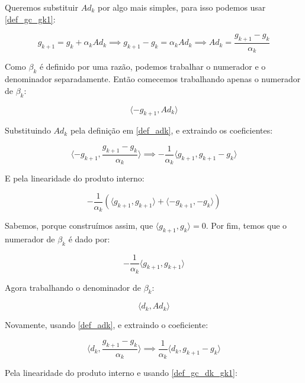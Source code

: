 Queremos substituir \(Ad_k\) por algo mais simples, para isso podemos usar \ref{def_gc_gk1}:

\begin{equation}
\label{def_adk}
g_{k+1} = g_k + \alpha_k A d_k \implies g_{k+1} - g_k = \alpha_k A d_k \implies A d_k = \frac{g_{k+1} - g_k}{\alpha_k}
\end{equation}

Como \(\beta_k\) é definido por uma razão, podemos trabalhar o numerador e o denominador
separadamente. Então comecemos trabalhando apenas o numerador de \(\beta_k\):

\begin{equation}
\langle -g_{k+1}, Ad_k \rangle
\end{equation}

Substituindo \(Ad_k\) pela definição em \ref{def_adk}, e extraindo os coeficientes:

\begin{equation}
\langle -g_{k+1}, \frac{g_{k+1} - g_k}{\alpha_k} \rangle \implies -\frac{1}{\alpha_k} \langle g_{k+1}, g_{k+1} - g_k \rangle
\end{equation}

E pela linearidade do produto interno:

\begin{equation}
-\frac{1}{\alpha_k}(\langle g_{k+1}, g_{k+1} \rangle + \langle -g_{k+1}, - g_k \rangle)
\end{equation}


Sabemos, porque construímos assim, que \(\langle g_{k+1}, g_k \rangle = 0\). Por fim, temos que o
numerador de \(\beta_k\) é dado por:

\begin{equation}
\label{def_gc_numerador}  
-\frac{1}{\alpha_k} \langle g_{k+1}, g_{k+1} \rangle
\end{equation}

Agora trabalhando o denominador de \(\beta_k\):

\begin{equation}
\langle d_k, Ad_k \rangle
\end{equation}


Novamente, usando \ref{def_adk}, e extraindo o coeficiente:

\begin{equation}
\langle d_k, \frac{g_{k+1} - g_k}{\alpha_k} \rangle \implies \frac{1}{\alpha_k}\langle d_k, g_{k+1} - g_k \rangle
\end{equation}

Pela linearidade do produto interno e usando \ref{def_gc_dk_gk1}:

